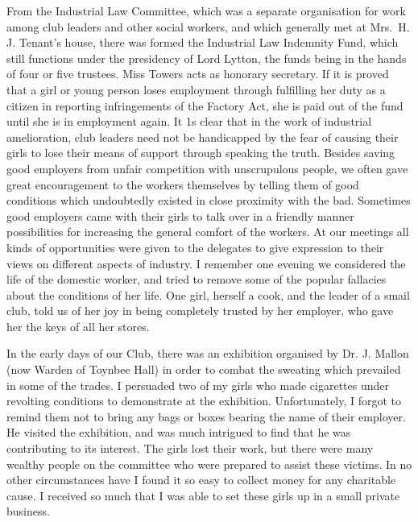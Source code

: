 From the Industrial Law Committee, which was a
separate organisation for work among club leaders and
other social workers, and which generally met at
Mrs.\ H. J. Tenant’s house, there was formed the Industrial
Law Indemnity Fund, which still functions under the
presidency of Lord Lytton, the funds being in the hands
of four or five trustees. Miss Towers acts as honorary
secretary. If it is proved that a girl or young person loses
employment through fulfilling her duty as a citizen in
reporting infringements of the Factory Act, she is paid
out of the fund until she is in employment again. It 1s
clear that in the work of industrial amelioration, club
leaders need not be handicapped by the fear of causing
their girls to lose their means of support through speaking
the truth. Besides saving good employers from unfair competition
with unscrupulous people, we often gave great
encouragement to the workers themselves by telling them
of good conditions which undoubtedly existed in close
proximity with the bad. Sometimes good employers came
with their girls to talk over in a friendly manner possibilities
for increasing the general comfort of the workers. At
our meetings all kinds of opportunities were given to the
delegates to give expression to their views on different
aspects of industry. I remember one evening we
considered the life of the domestic worker, and tried to
remove some of the popular fallacies about the conditions
of her life. One girl, herself a cook, and the leader of a
smail club, told us of her joy in being completely trusted
by her employer, who gave her the keys of all her stores.

In the early days of our Club, there was an exhibition
organised by Dr. J. Mallon (now Warden of Toynbee
Hall) in order to combat the sweating which prevailed in
some of the trades. I persuaded two of my girls who
made cigarettes under revolting conditions to demonstrate
at the exhibition. Unfortunately, I forgot to remind them
not to bring any bags or boxes bearing the name of their
employer. He visited the exhibition, and was much
intrigued to find that he was contributing to its interest.
The girls lost their work, but there were many wealthy
people on the committee who were prepared to assist
these victims. In no other circumstances have I found it
so easy to collect money for any charitable cause. I
received so much that I was able to set these girls up in
a small private business.

